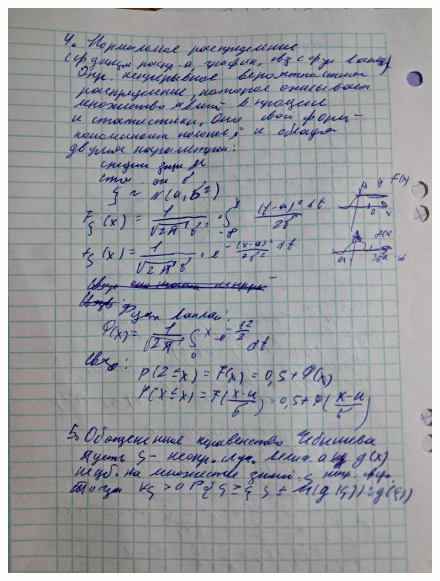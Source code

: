 \documentclass{article}
\begin{document}
\begin{figure}[H]
    \centering
    \includegraphics[width=1\linewidth]{photo_5323477539961828018_y.jpg}
\end{figure}
\end{document}
